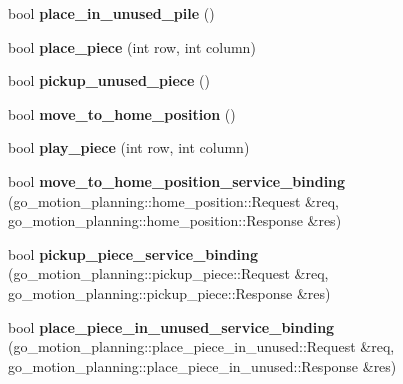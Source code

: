 \begin{DoxyCompactItemize}
\item 
\mbox{\label{classgo__motion__planner_ad532e8f592e7f82f2c1b216c39a2cf30}} 
bool {\bfseries place\+\_\+in\+\_\+unused\+\_\+pile} ()
\item 
\mbox{\label{classgo__motion__planner_a2b49683bb6488c9cab3e22a40e4e854e}} 
bool {\bfseries place\+\_\+piece} (int row, int column)
\item 
\mbox{\label{classgo__motion__planner_a1d0d55d9c4b20319a3164d1656ebcf21}} 
bool {\bfseries pickup\+\_\+unused\+\_\+piece} ()
\item 
\mbox{\label{classgo__motion__planner_ac27b5567f1dd182fbf3d99b56e10155f}} 
bool {\bfseries move\+\_\+to\+\_\+home\+\_\+position} ()
\item 
\mbox{\label{classgo__motion__planner_a4eaf2e9291a24b12dafc684cd779c99a}} 
bool {\bfseries play\+\_\+piece} (int row, int column)
\item 
\mbox{\label{classgo__motion__planner_a0c6c7c5eaccf9b3015cd1e85afdc12b5}} 
bool {\bfseries move\+\_\+to\+\_\+home\+\_\+position\+\_\+service\+\_\+binding} (go\+\_\+motion\+\_\+planning\+::home\+\_\+position\+::\+Request \&req, go\+\_\+motion\+\_\+planning\+::home\+\_\+position\+::\+Response \&res)
\item 
\mbox{\label{classgo__motion__planner_ade2c6db47d4a71876bd7d7382858adb9}} 
bool {\bfseries pickup\+\_\+piece\+\_\+service\+\_\+binding} (go\+\_\+motion\+\_\+planning\+::pickup\+\_\+piece\+::\+Request \&req, go\+\_\+motion\+\_\+planning\+::pickup\+\_\+piece\+::\+Response \&res)
\item 
\mbox{\label{classgo__motion__planner_a1b342edd58e79805e576cc241a2b39cd}} 
bool {\bfseries place\+\_\+piece\+\_\+in\+\_\+unused\+\_\+service\+\_\+binding} (go\+\_\+motion\+\_\+planning\+::place\+\_\+piece\+\_\+in\+\_\+unused\+::\+Request \&req, go\+\_\+motion\+\_\+planning\+::place\+\_\+piece\+\_\+in\+\_\+unused\+::\+Response \&res)
\item 
\mbox{\label{classgo__motion__planner_a99b71bff95631b79ff39b30c58730813}} 

\end{DoxyCompactItemize}
